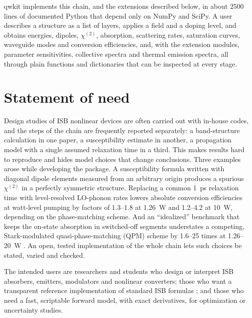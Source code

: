 \documentclass[11pt]{article}
\newcommand{\chitwo}{\chi^{(2)}}
\begin{document}
qwkit implements this chain, and the extensions described below, in about 2500 lines of documented Python that depend only on NumPy and SciPy. A user describes a structure as a list of layers, applies a field and a doping level, and obtains energies, dipoles, $\chitwo$, absorption, scattering rates, saturation curves, waveguide modes and conversion efficiencies, and, with the extension modules, parameter sensitivities, collective spectra and thermal emission spectra, all through plain functions and dictionaries that can be inspected at every stage.

\section{Statement of need}
Design studies of ISB nonlinear devices are often carried out with in-house codes, and the steps of the chain are frequently reported separately: a band-structure calculation in one paper, a susceptibility estimate in another, a propagation model with a single assumed relaxation time in a third. This makes results hard to reproduce and hides model choices that change conclusions. Three examples arose while developing the package. A susceptibility formula written with diagonal dipole elements measured from an arbitrary origin produces a spurious $\chitwo$ in a perfectly symmetric structure. Replacing a common 1~ps relaxation time with level-resolved LO-phonon rates lowers absolute conversion efficiencies at watt-level pumping by factors of 1.3--1.8 at 1.26~W and 1.2--4.2 at 10~W, depending on the phase-matching scheme. And an ``idealized'' benchmark that keeps the on-state absorption in switched-off segments understates a competing, Stark-modulated quasi-phase-matching (QPM) scheme by 1.6--25 times at 1.26--20~W \cite{Ownby2026N1}. An open, tested implementation of the whole chain lets such choices be stated, varied and checked.

The intended users are researchers and students who design or interpret ISB absorbers, emitters, modulators and nonlinear converters; those who want a transparent reference implementation of standard ISB formulas \cite{Vurgaftman2021}; and those who need a fast, scriptable forward model, with exact derivatives, for optimization or uncertainty studies.
\end{document}
